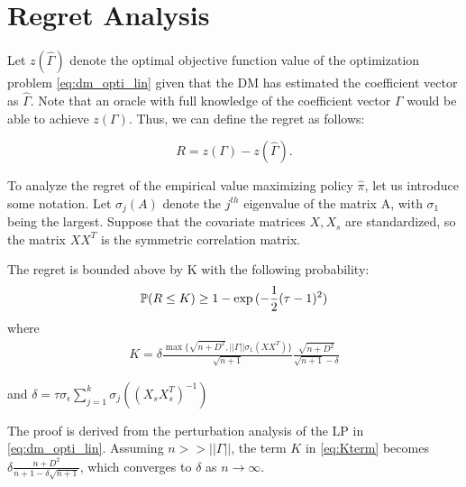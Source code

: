 \documentclass[11pt,a4paper]{article}
\begin{document}

\iffalse
or, we can write: %

$$Max_{\hat \pi, y_i}: E \left( \left(\hat \Gamma^T X Diag(A \mathbf{1}_{N} ) ^{-1} A \right) \hat \pi  - \sum_{i \leq N} y_i \right)$$ subject to: 

$$\forall i,  \left( Diag(A \mathbf{1}_{N} ) ^{-1} A \hat \pi \right)_i \leq y_i$$

$$\forall i, y_i, \hat \pi_i \in \{0,1\} $$
\fi

\section{Regret Analysis}
Let $z(\hat \Gamma)$ denote the optimal objective function value of the optimization problem \eqref{eq:dm_opti_lin} given that the DM has estimated the coefficient vector as $\hat{\Gamma} $. Note that an oracle with full knowledge of the coefficient vector $\Gamma$ would be able to achieve $z(\Gamma)$. Thus, we can define the regret as follows:

$$R = z(\Gamma) - z(\hat{\Gamma}) .$$

To analyze the regret of the empirical value maximizing policy $\hat \pi$, let us introduce some notation. Let $\sigma_j( A)$ denote the $j^{th}$ eigenvalue of the matrix A, with $\sigma_1$ being the largest. Suppose that the covariate matrices $X, X_s$ are standardized, so the matrix $X X^T$ is the symmetric correlation matrix. 
\begin{thm}
The regret is bounded above by K with the following probability:
\begin{align}
\mathbb{P}(R \leq K) \geq 1 - \exp{(-\frac{1}{2} (\tau -1 )^2 )}
\end{align}
where
\begin{align}\label{eq:Kterm}
K = \delta \frac{ \max \{\sqrt{n+D^2}, || \Gamma || \sigma_{1} (X X^T) \} }{ \sqrt{n+1} } \frac{ \sqrt{n+D^2} }{\sqrt{n+1} - \delta }
\end{align}

and $\delta = \tau \sigma_\epsilon \sum_{j=1}^k \sigma_j( (X_s X_s^T)^{-1})$
\end{thm}

The proof is derived from the perturbation analysis of the LP in \eqref{eq:dm_opti_lin}. Assuming $n >> ||\Gamma||$, the term $K$ in \eqref{eq:Kterm} becomes $\delta \frac{n+D^2}{n+1 -  \delta \sqrt{n+1}}$, which converges to $\delta$ as $n \rightarrow \infty$.
\end{document}

